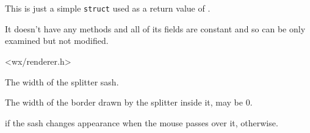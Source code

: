 

\section{}\label{wxsplitterrenderparams}

This is just a simple {\tt struct} used as a return value of 
.

It doesn't have any methods and all of its fields are constant and so can be
only examined but not modified.


<wx/renderer.h>




The width of the splitter sash.




The width of the border drawn by the splitter inside it, may be $0$.




\true if the sash changes appearance when the mouse passes over it, \false
otherwise.


